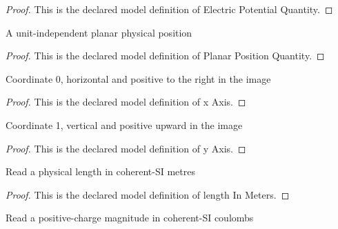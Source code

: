 \begin{proof}
  This is the declared model definition of Electric Potential Quantity.
\end{proof}
\begin{definition}
  \label{def:physics:phyx-mini-0858:phyxminiproblems-problemphyxmini0858-planarpositionquantity}
  A unit-independent planar physical position
\end{definition}
\begin{proof}
  This is the declared model definition of Planar Position Quantity.
\end{proof}
\begin{definition}[x Axis]
  \label{def:physics:phyx-mini-0858:phyxminiproblems-problemphyxmini0858-xaxis}
  Coordinate 0, horizontal and positive to the right in the image
\end{definition}
\begin{proof}
  This is the declared model definition of x Axis.
\end{proof}
\begin{definition}[y Axis]
  \label{def:physics:phyx-mini-0858:phyxminiproblems-problemphyxmini0858-yaxis}
  Coordinate 1, vertical and positive upward in the image
\end{definition}
\begin{proof}
  This is the declared model definition of y Axis.
\end{proof}
\begin{definition}
  \label{def:physics:phyx-mini-0858:phyxminiproblems-problemphyxmini0858-lengthinmeters}
  Read a physical length in coherent-SI metres
\end{definition}
\begin{proof}
  This is the declared model definition of length In Meters.
\end{proof}
\begin{definition}
  \label{def:physics:phyx-mini-0858:phyxminiproblems-problemphyxmini0858-chargeincoulombs}
  Read a positive-charge magnitude in coherent-SI coulombs
\end{definition}
